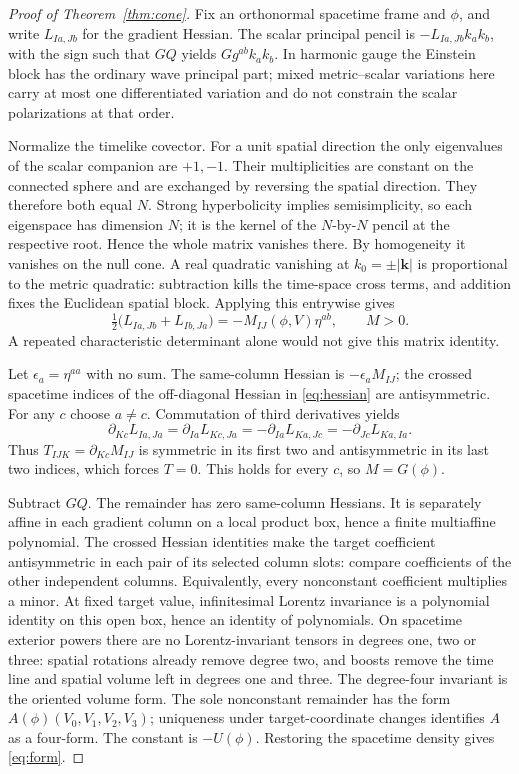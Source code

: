 \begin{proof}[Proof of Theorem~\ref{thm:cone}]
Fix an orthonormal spacetime frame and \(\phi\), and write \(L_{Ia,Jb}\) for the gradient Hessian. The scalar principal pencil is \(-L_{Ia,Jb}k_a k_b\), with the sign such that \(GQ\) yields \(Gg^{ab}k_ak_b\). In harmonic gauge the Einstein block has the ordinary wave principal part; mixed metric--scalar variations here carry at most one differentiated variation and do not constrain the scalar polarizations at that order.

Normalize the timelike covector. For a unit spatial direction the only eigenvalues of the scalar companion are \(+1,-1\). Their multiplicities are constant on the connected sphere and are exchanged by reversing the spatial direction. They therefore both equal \(N\). Strong hyperbolicity implies semisimplicity, so each eigenspace has dimension \(N\); it is the kernel of the \(N\)-by-\(N\) pencil at the respective root. Hence the whole matrix vanishes there. By homogeneity it vanishes on the null cone. A real quadratic vanishing at \(k_0=\pm|\mathbf k|\) is proportional to the metric quadratic: subtraction kills the time-space cross terms, and addition fixes the Euclidean spatial block. Applying this entrywise gives
\begin{equation}\label{eq:hessian}
 \tfrac12\bigl(L_{Ia,Jb}+L_{Ib,Ja}\bigr)
       =-M_{IJ}(\phi,V)\eta^{ab},\qquad M>0.
\end{equation}
A repeated characteristic determinant alone would not give this matrix identity.

Let \(\epsilon_a=\eta^{aa}\) with no sum. The same-column Hessian is \(-\epsilon_a M_{IJ}\); the crossed spacetime indices of the off-diagonal Hessian in \eqref{eq:hessian} are antisymmetric. For any \(c\) choose \(a\ne c\). Commutation of third derivatives yields
\[
 \partial_{Kc}L_{Ia,Ja}
   =\partial_{Ia} L_{Kc,Ja}
   =-\partial_{Ia}L_{Ka,Jc}
   =-\partial_{Jc}L_{Ka,Ia}.
\]
Thus \(T_{IJK}=\partial_{Kc}M_{IJ}\) is symmetric in its first two and antisymmetric in its last two indices, which forces \(T=0\). This holds for every \(c\), so \(M=G(\phi)\).

Subtract \(GQ\). The remainder has zero same-column Hessians. It is separately affine in each gradient column on a local product box, hence a finite multiaffine polynomial. The crossed Hessian identities make the target coefficient antisymmetric in each pair of its selected column slots: compare coefficients of the other independent columns. Equivalently, every nonconstant coefficient multiplies a minor. At fixed target value, infinitesimal Lorentz invariance is a polynomial identity on this open box, hence an identity of polynomials. On spacetime exterior powers there are no Lorentz-invariant tensors in degrees one, two or three: spatial rotations already remove degree two, and boosts remove the time line and spatial volume left in degrees one and three. The degree-four invariant is the oriented volume form. The sole nonconstant remainder has the form \(A(\phi)(V_0,V_1,V_2,V_3)\); uniqueness under target-coordinate changes identifies \(A\) as a four-form. The constant is \(-U(\phi)\). Restoring the spacetime density gives \eqref{eq:form}.


\end{proof}
